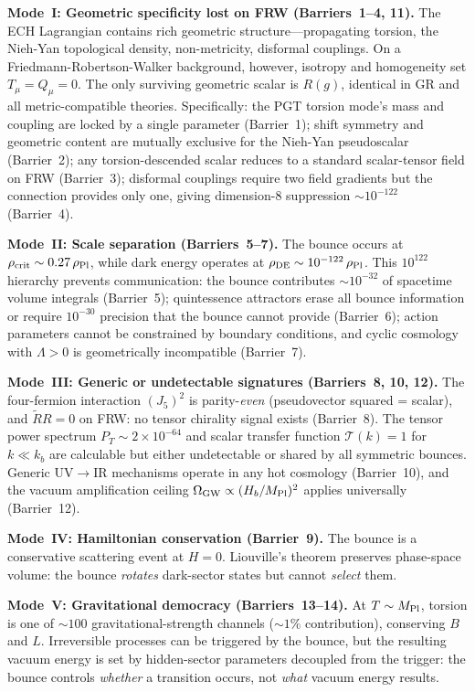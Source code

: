 \documentclass[aps,prd,twocolumn,superscriptaddress,showpacs,preprintnumbers,nofootinbib,longbibliography,floatfix]{revtex4-2}
\newcommand{\MPl}{M_{\rm Pl}}
\newcommand{\rhocrit}{\rho_{\rm crit}}
\newcommand{\rhoPl}{\rho_{\rm Pl}}
\begin{document}
\medskip
\noindent\textbf{Mode~I: Geometric specificity lost on FRW
(Barriers~1--4, 11).}
The ECH Lagrangian contains rich geometric structure---propagating torsion,
the Nieh-Yan topological density, non-metricity, disformal couplings.  On a
Friedmann-Robertson-Walker background, however, isotropy and homogeneity set
$T_\mu = Q_\mu = 0$.  The only surviving geometric scalar is $R(g)$, identical
in GR and all metric-compatible theories.  Specifically:
the PGT torsion mode's mass and coupling are locked by a single parameter
(Barrier~1);
shift symmetry and geometric content are mutually exclusive for the Nieh-Yan
pseudoscalar (Barrier~2);
any torsion-descended scalar reduces to a standard scalar-tensor field on FRW
(Barrier~3);
disformal couplings require two field gradients but the connection provides
only one, giving dimension-8 suppression $\sim 10^{-122}$ (Barrier~4).

\medskip
\noindent\textbf{Mode~II: Scale separation (Barriers~5--7).}
The bounce occurs at $\rhocrit \sim 0.27\,\rhoPl$, while dark energy operates
at $\rho_{\rm DE} \sim 10^{-122}\,\rhoPl$.  This $10^{122}$ hierarchy
prevents communication: the bounce contributes $\sim 10^{-32}$ of spacetime
volume integrals (Barrier~5); quintessence attractors erase all bounce
information or require $10^{-30}$ precision that the bounce cannot provide
(Barrier~6); action parameters cannot be constrained by boundary conditions,
and cyclic cosmology with $\Lambda > 0$ is geometrically incompatible
(Barrier~7).

\medskip
\noindent\textbf{Mode~III: Generic or undetectable signatures
(Barriers~8, 10, 12).}
The four-fermion interaction $(J_5)^2$ is parity-\emph{even}
(pseudovector squared = scalar), and $\tilde{R}R = 0$ on FRW: no tensor
chirality signal exists (Barrier~8).  The tensor power spectrum
$P_T \sim 2 \times 10^{-64}$ and scalar transfer function $\mathcal{T}(k) = 1$
for $k \ll k_b$ are calculable but either undetectable or shared by all
symmetric bounces.  Generic UV$\to$IR mechanisms operate in any hot cosmology
(Barrier~10), and the vacuum amplification ceiling
$\Omega_{\rm GW} \propto (H_b/\MPl)^2$ applies universally (Barrier~12).

\medskip
\noindent\textbf{Mode~IV: Hamiltonian conservation (Barrier~9).}
The bounce is a conservative scattering event at $H = 0$.  Liouville's
theorem preserves phase-space volume: the bounce \emph{rotates} dark-sector
states but cannot \emph{select} them.

\medskip
\noindent\textbf{Mode~V: Gravitational democracy (Barriers~13--14).}
At $T \sim \MPl$, torsion is one of $\sim 100$ gravitational-strength
channels ($\sim 1\%$ contribution), conserving $B$ and $L$.  Irreversible
processes can be triggered by the bounce, but the resulting vacuum energy is
set by hidden-sector parameters decoupled from the trigger: the bounce
controls \emph{whether} a transition occurs, not \emph{what} vacuum energy
results.
\end{document}
